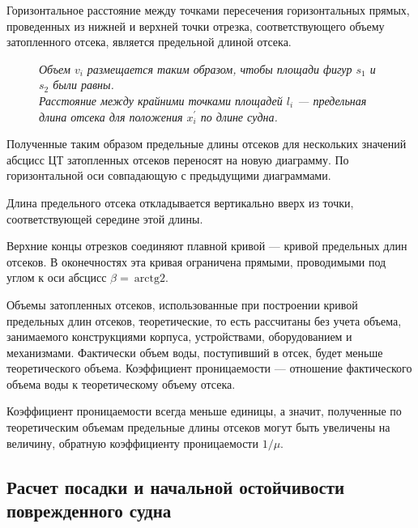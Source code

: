 Горизонтальное расстояние между точками пересечения горизонтальных прямых, проведенных из нижней и верхней точки отрезка, соответствующего объему затопленного отсека, является предельной длиной отсека.

\begin{figure}[h!]
    \centerline{}
    \caption{К расчету кривой предельных длин отсеков}
    \caption*{\textit{
        Объем $v_i$ размещается таким образом, чтобы площади фигур $s_1$ и $s_2$ были равны.\\
        Расстояние между крайними точками площадей $l_i$ --- предельная длина отсека для положения $x^{\prime}_i$ по длине судна.
    }}
    \label{fig:max-length-curve}
\end{figure}

Полученные таким образом предельные длины отсеков для нескольких значений абсцисс ЦТ затопленных отсеков переносят на новую диаграмму.
По горизонтальной оси совпадающую с предыдущими диаграммами.

Длина предельного отсека откладывается вертикально вверх из точки, соответствующей середине этой длины.

Верхние концы отрезков соединяют плавной кривой --- кривой предельных длин отсеков.
В оконечностях эта кривая ограничена прямыми, проводимыми под углом к оси абсцисс $\beta=\ \mathrm{arctg}2$.

Объемы затопленных отсеков, использованные при построении кривой предельных длин отсеков, теоретические, то есть рассчитаны без учета объема, занимаемого конструкциями корпуса, устройствами, оборудованием и механизмами.
Фактически объем воды, поступивший в отсек, будет меньше теоретического объема.
Коэффициент проницаемости --- отношение фактического объема воды к теоретическому объему отсека.

Коэффициент проницаемости всегда меньше единицы, а значит, полученные по теоретическим объемам предельные длины отсеков могут быть увеличены на величину, обратную коэффициенту проницаемости $1 / \mu$.

\begin{figure}[h!]
    \centerline{}
    \caption{Пример кривой предельных длин отсеков}
    \caption*{\textit{}}
    \label{fig:max-length-diagram}
\end{figure}

\subsection{Расчет посадки и начальной остойчивости поврежденного судна}

